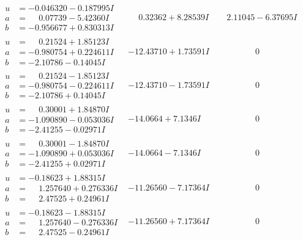 \documentclass[1p]{elsarticle_modified}
\theoremstyle{definition}
\begin{document}
$$\begin{array}{c|c|c}
\begin{aligned}
u &= -0.046320 - 0.187995 I \\
a &= \phantom{-}0.07739 - 5.42360 I \\
b &= -0.956677 + 0.830313 I\end{aligned}
 & \phantom{-}0.32362 + 8.28539 I & \phantom{-}2.11045 - 6.37695 I \\ \hline\begin{aligned}
u &= \phantom{-}0.21524 + 1.85123 I \\
a &= -0.980754 + 0.224611 I \\
b &= -2.10786 - 0.14045 I\end{aligned}
 & -12.43710 + 1.73591 I & \phantom{-0.000000 } 0 \\ \hline\begin{aligned}
u &= \phantom{-}0.21524 - 1.85123 I \\
a &= -0.980754 - 0.224611 I \\
b &= -2.10786 + 0.14045 I\end{aligned}
 & -12.43710 - 1.73591 I & \phantom{-0.000000 } 0 \\ \hline\begin{aligned}
u &= \phantom{-}0.30001 + 1.84870 I \\
a &= -1.090890 - 0.053036 I \\
b &= -2.41255 - 0.02971 I\end{aligned}
 & -14.0664 + 7.1346 I & \phantom{-0.000000 } 0 \\ \hline\begin{aligned}
u &= \phantom{-}0.30001 - 1.84870 I \\
a &= -1.090890 + 0.053036 I \\
b &= -2.41255 + 0.02971 I\end{aligned}
 & -14.0664 - 7.1346 I & \phantom{-0.000000 } 0 \\ \hline\begin{aligned}
u &= -0.18623 + 1.88315 I \\
a &= \phantom{-}1.257640 + 0.276336 I \\
b &= \phantom{-}2.47525 + 0.24961 I\end{aligned}
 & -11.26560 - 7.17364 I & \phantom{-0.000000 } 0 \\ \hline\begin{aligned}
u &= -0.18623 - 1.88315 I \\
a &= \phantom{-}1.257640 - 0.276336 I \\
b &= \phantom{-}2.47525 - 0.24961 I\end{aligned}
 & -11.26560 + 7.17364 I & \phantom{-0.000000 } 0 \\ \hline\begin{aligned}

\end{aligned}
\end{array}$$
\end{document}
